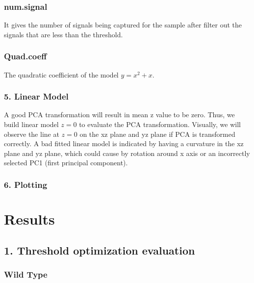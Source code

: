 \documentclass[10pt,letterpaper]{article}
\begin{document}
\hypertarget{num.signal}{%
\subsubsection{num.signal}\label{num.signal}}

It gives the number of signals being captured for the sample after
filter out the signals that are less than the threshold.

\hypertarget{quad.coeff}{%
\subsubsection{Quad.coeff}\label{quad.coeff}}

The quadratic coefficient of the model \(y=x^2+x\).

\hypertarget{linear-model}{%
\subsubsection{5. Linear Model}\label{linear-model}}

A good PCA transformation will result in mean z value to be zero. Thus,
we build linear model \(z=0\) to evaluate the PCA transformation.
Visually, we will observe the line at \(z=0\) on the xz plane and yz
plane if PCA is transformed correctly. A bad fitted linear model is
indicated by having a curvature in the xz plane and yz plane, which
could cause by rotation around x axis or an incorrectly selected PC1
(first principal component).

\hypertarget{plotting}{%
\subsubsection{6. Plotting}\label{plotting}}

\hypertarget{results}{%
\section{Results}\label{results}}

\hypertarget{threshold-optimization-evaluation}{%
\subsection{1. Threshold optimization
evaluation}\label{threshold-optimization-evaluation}}

\hypertarget{wild-type}{%
\subsubsection{Wild Type}\label{wild-type}}
\end{document}
